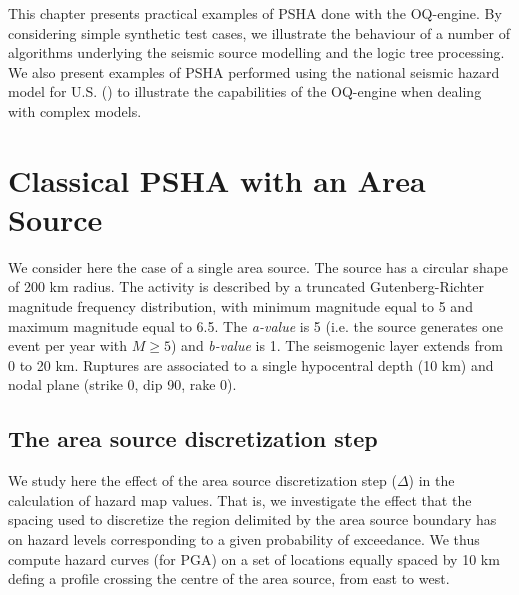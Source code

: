 This chapter presents practical examples of PSHA done with the OQ-engine. By
considering simple synthetic test cases, we illustrate the behaviour of a number
of algorithms underlying the seismic source modelling and the logic tree
processing. We also present examples of PSHA performed using the national
seismic hazard model for U.S. (\cite{petersen2008}) to illustrate the
capabilities of the OQ-engine when dealing with complex models.

\section{Classical PSHA with an Area Source} We consider here the case of a
single area source. The source has a circular shape of 200 km radius. The
activity is described by a truncated Gutenberg-Richter magnitude frequency
distribution, with minimum magnitude equal to 5 and maximum magnitude equal to
6.5. The \textit{a-value} is 5 (i.e. the source generates one event per year
with $M \ge 5$) and \textit{b-value} is 1. The seismogenic layer extends from 0
to 20 km.  Ruptures are associated to a single hypocentral depth (10 km) and
nodal plane (strike 0, dip 90, rake 0).

\subsection{The area source discretization step} We study here the effect of the
area source discretization step ($\Delta$) in the calculation of hazard map
values. That is, we investigate the effect that the spacing used to discretize
the region delimited by the area source boundary has on hazard levels
corresponding to a given probability of exceedance. We thus compute hazard
curves (for PGA) on a set of locations equally spaced by 10 km defing a profile
crossing the centre of the area source, from east to west.

